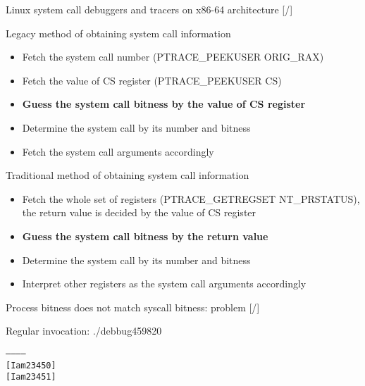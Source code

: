 \documentclass[unicode,aspectratio=169,xcolor={table,dvipsnames,usernames}]{beamer}
\begin{document}
\begin{frame}{Linux system call debuggers and tracers on x86-64 architecture \hfill [\insertframenumber/\inserttotalframenumber]}
\large
\begin{block}{Legacy method of obtaining system call information}
\begin{itemize}
	\item Fetch the system call number (PTRACE\_PEEKUSER ORIG\_RAX)
	\item Fetch the value of CS register (PTRACE\_PEEKUSER CS)
	\item {\bf Guess the system call bitness by the value of CS register}
	\item Determine the system call by its number and bitness
	\item Fetch the system call arguments accordingly
\end{itemize}
\end{block}

\begin{block}{Traditional method of obtaining system call information}
\begin{itemize}
	\item Fetch the whole set of registers (PTRACE\_GETREGSET NT\_PRSTATUS), \\
		the return value is decided by the value of CS register
	\item {\bf Guess the system call bitness by the return value}
	\item Determine the system call by its number and bitness
	\item Interpret other registers as the system call arguments accordingly
\end{itemize}
\end{block}
\end{frame}

\begin{frame}[fragile]{Process bitness does not match syscall bitness: problem \hfill [\insertframenumber/\inserttotalframenumber]}
\large
{}

\begin{block}{Regular invocation: ./debbug459820}
\begin{alltt}
------------
[I am 23450]
[I am 23451]
\end{alltt}
\end{block}
\end{frame}
\end{document}
